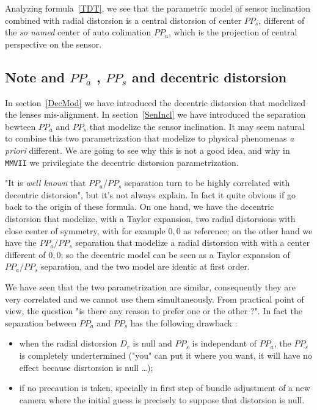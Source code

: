 Analyzing formula~\ref{TDT}, we see
that the parametric model of sensor inclination  combined with radial distorsion
is a central distorsion of center $PP_s$, different of the \emph{so named}
center of auto colimation $PP_a$, which is the projection of central perspective on the sensor.


\subsection{Note and $PP_a$ , $PP_s$ and decentric distorsion}
\label{PPA:PPS:DEC}

In section~\ref{DecMod} we have introduced the decentric distorsion that
modelized the lenses mis-alignment.  In  section~\ref{SenIncl}
we have introduced the separation bewteen $PP_a$ and $PP_s$ that modelize
the sensor inclination.  It may seem natural to combine this two
parametrization that modelize to physical phenomenas \emph{a priori}
different. We are going to see why this is not a good idea, and why in
{\tt MMVII} we privilegiate the decentric distorsion parametrization.

"It is \emph{well known} that  $PP_a/PP_s$ separation turn to be highly
correlated with decentric distorsion", but it's not always explain. In fact
it quite obvious if go back to the origin of these formula.  On one hand, we have 
the decentric distorsion that modelize, with a Taylor expansion, two radial distorsions
with close center of symmetry, with for example $0,0$ as reference;
on the other hand we have the $PP_a/PP_s$ separation that modelize 
a radial distorsion with with a center different of $0,0$; so the decentric model
can be seen as a Taylor expansion of $PP_a/PP_s$  separation, and the two model
are identic at first order.


We have seen that the two parametrization are similar, consequently they are
very correlated and we cannot use them simultaneously. From practical point of view,
the question "is there any reason to prefer one or the other ?".
In fact the separation between $PP_a$ and $PP_s$ has the following drawback :

\begin{itemize}
   \item when the radial distorsion $D_r$ is null and $PP_s$ is independant of $PP_a$, the 
         $PP_s$ is completely undertermined ("you" can put it where you want, it will have no 
         effect because disrtorsion is null \dots);

   \item  if no precaution is taken, specially in first step of bundle adjustment 
          of a new camera where the initial guess is precisely to suppose that distorsion
          is null.
\end{itemize}

